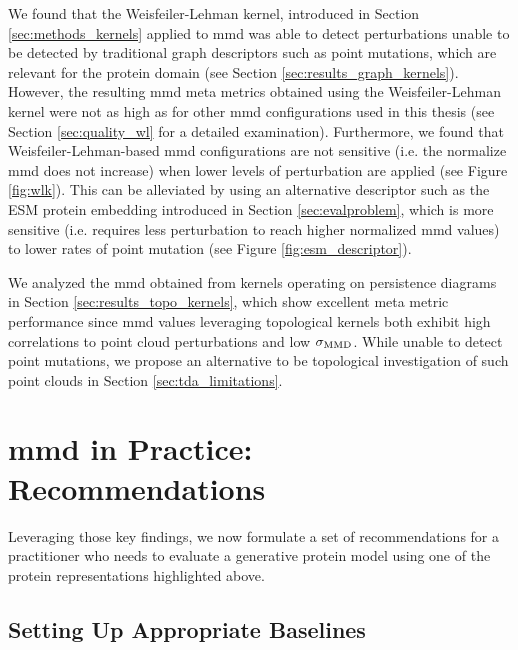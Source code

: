 We found that the Weisfeiler-Lehman kernel, introduced in Section
\ref{sec:methods_kernels} applied to \gls{mmd} was able to detect
perturbations unable to be detected by traditional graph descriptors such as
point mutations, which are relevant for the protein domain (see Section
\ref{sec:results_graph_kernels}). However, the resulting \gls{mmd} meta metrics
obtained using the Weisfeiler-Lehman kernel were not as high as for other \gls{mmd}
configurations used in this thesis (see Section \ref{sec:quality_wl} for a
detailed examination). Furthermore, we found that Weisfeiler-Lehman-based \gls{mmd}
configurations are not sensitive (i.e. the normalize \gls{mmd} does not increase) when
lower levels of perturbation are applied (see Figure \ref{fig:wlk}). This can be
alleviated by using an alternative descriptor such as the ESM protein embedding
introduced in Section \ref{sec:evalproblem}, which is more sensitive (i.e.
requires less perturbation to reach higher normalized \gls{mmd} values) to lower rates
of point mutation (see Figure \ref{fig:esm_descriptor}).

We analyzed the \gls{mmd} obtained from kernels operating on persistence diagrams in
Section \ref{sec:results_topo_kernels}, which show excellent meta metric performance since
\gls{mmd} values leveraging topological kernels both exhibit high correlations to
point cloud perturbations and low $\sigma_{\text{MMD}}$. While unable to detect
point mutations, we propose an alternative to be topological investigation of such point
clouds in Section \ref{sec:tda_limitations}.

\section{\gls{mmd} in Practice: Recommendations}\label{sec:discussion_recommendations}

Leveraging those key findings, we now formulate a set of recommendations for a
practitioner who needs to evaluate a generative protein model using one of the
protein representations highlighted above.


\subsection{Setting Up Appropriate Baselines}\label{sec:discussion_baselines}

